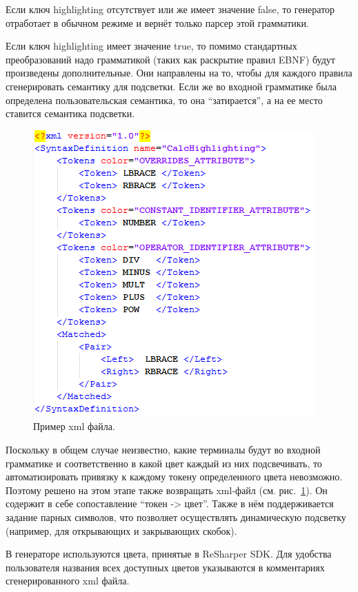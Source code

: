 Если ключ highlighting отсутствует или же имеет значение false, то генератор отработает в обычном режиме и вернёт только парсер этой грамматики. 

Если ключ highlighting имеет значение true, то помимо стандартных преобразований надо грамматикой (таких как раскрытие правил EBNF) будут произведены дополнительные. Они направлены на то, чтобы для каждого правила сгенерировать семантику для подсветки. Если же во входной грамматике была определена пользовательская семантика, то она ``затирается'', а на ее место ставится семантика подсветки. 

\begin{figure}[t]
\centering
\includegraphics{Ivanov/Pictures/xmlExample.PNG}
\caption{Пример xml файла.}
\label{xml}
\end{figure}

Поскольку в общем случае неизвестно, какие терминалы будут во входной грамматике и соответственно в какой цвет каждый из них подсвечивать, то автоматизировать привязку к каждому токену определенного цвета невозможно. Поэтому решено на этом этапе также возвращать xml-файл (см. рис.~\ref{xml}). Он содержит в себе сопоставление ``токен -> цвет''. Также в нём поддерживается задание парных символов, что позволяет осуществлять динамическую подсветку (например, для открывающих и закрывающих скобок). 

В генераторе используются цвета, принятые в ReSharper SDK. Для удобства пользователя названия всех доступных цветов указываются в комментариях сгенерированного xml файла. 
